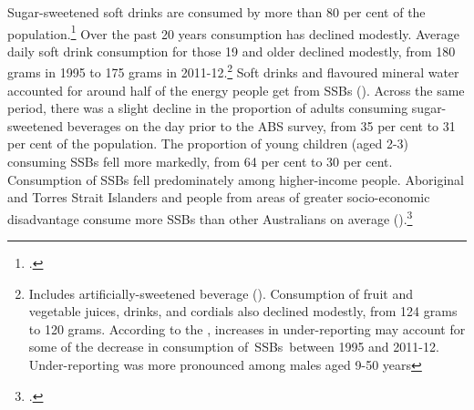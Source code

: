 \documentclass[embargoed]{grattan}
\begin{document}
Sugar-sweetened soft drinks are consumed by more than 80 per cent of the population.\footcite{Levy2014QuenchingAustraliasthirst} %
\CenturyFootnote  %
Over the past 20 years consumption has declined modestly. Average daily soft drink consumption for those 19 and older declined modestly, from 180 grams in 1995 to 175 grams in 2011-12.\footnote{Includes artificially-sweetened beverage (\textcites[][Table~5.1]{ABS20144364055007AustralianHealth}[][Table~1]{ABS199948040NationalNutrition}). Consumption of fruit and vegetable juices, drinks, and cordials also declined modestly, from 124 grams to 120 grams. According to the \textcite{ABS20144364055007AustralianHealth}, increases in under-reporting may account for some of the decrease in consumption of~SSBs~between 1995 and 2011-12. Under-reporting was more pronounced among males aged 9-50 years} %
Soft drinks and flavoured mineral water accounted for around half of the energy people get from SSBs ().
Across the same period, there was a slight decline in the proportion of adults consuming sugar-sweetened beverages on the day prior to the ABS survey, from 35 per cent to 31 per cent of the population.
The proportion of young children (aged 2-3) consuming SSBs fell more markedly, from 64 per cent to 30 per cent.
Consumption of SSBs fell predominately among higher-income people.
Aboriginal and Torres Strait Islanders and people from areas of greater socio-economic disadvantage consume more SSBs than other Australians on average ().\footcites{ABS20144364055007AustralianHealth}{ABS199948040NationalNutrition}
\end{document}
